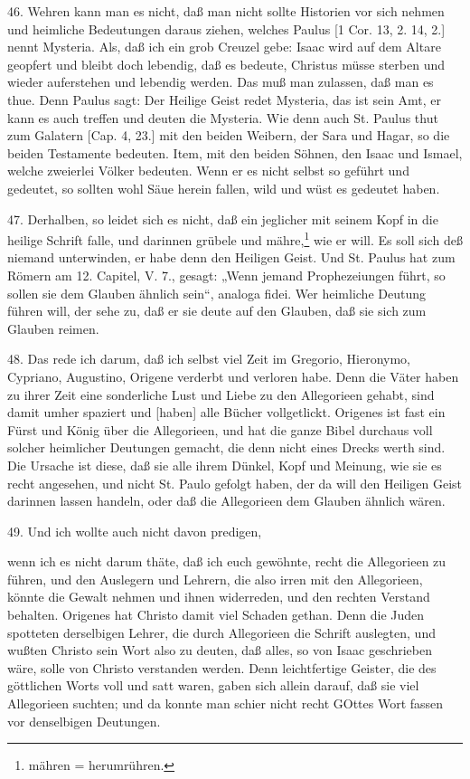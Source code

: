 46. Wehren kann man es nicht, daß man nicht sollte Historien vor sich nehmen und heimliche Bedeutungen daraus ziehen, welches Paulus [1 Cor. 13, 2. 14, 2.] nennt Mysteria. Als, daß ich ein grob Creuzel gebe: Isaac wird auf dem Altare geopfert und bleibt doch lebendig, daß es bedeute, Christus müsse sterben und wieder auferstehen und lebendig werden. Das muß man zulassen, daß man es thue. Denn Paulus sagt: Der Heilige Geist redet Mysteria, das ist sein Amt, er kann es auch treffen und deuten die Mysteria. Wie denn auch St. Paulus thut zum Galatern [Cap. 4, 23.] mit den beiden Weibern, der Sara und Hagar, so die beiden Testamente bedeuten. Item, mit den beiden Söhnen, den Isaac und Ismael, welche zweierlei Völker bedeuten. Wenn er es nicht selbst so geführt und gedeutet, so sollten wohl Säue herein fallen, wild und wüst es gedeutet haben.

47. Derhalben, so leidet sich es nicht, daß ein jeglicher mit seinem Kopf in die heilige Schrift falle, und darinnen grübele und mähre,\footnote{mähren = herumrühren.} wie er will. Es soll sich deß niemand unterwinden, er habe denn den Heiligen Geist. Und St. Paulus hat zum Römern am 12. Capitel, V. 7., gesagt: „Wenn jemand Prophezeiungen führt, so sollen sie dem Glauben ähnlich sein“, analoga fidei. Wer heimliche Deutung führen will, der sehe zu, daß er sie deute auf den Glauben, daß sie sich zum Glauben reimen.

48. Das rede ich darum, daß ich selbst viel Zeit im Gregorio, Hieronymo, Cypriano, Augustino, Origene verderbt und verloren habe. Denn die Väter haben zu ihrer Zeit eine sonderliche Lust und Liebe zu den Allegorieen gehabt, sind damit umher spaziert und [haben] alle Bücher vollgetlickt. Origenes ist fast ein Fürst und König über die Allegorieen, und hat die ganze Bibel durchaus voll solcher heimlicher Deutungen gemacht, die denn nicht eines Drecks werth sind. Die Ursache ist diese, daß sie alle ihrem Dünkel, Kopf und Meinung, wie sie es recht angesehen, und nicht St. Paulo gefolgt haben, der da will den Heiligen Geist darinnen lassen handeln, oder daß die Allegorieen dem Glauben ähnlich wären.

49. Und ich wollte auch nicht davon predigen,

wenn ich es nicht darum thäte, daß ich euch gewöhnte, recht die Allegorieen zu führen, und den Auslegern und Lehrern, die also irren mit den Allegorieen, könnte die Gewalt nehmen und ihnen widerreden, und den rechten Verstand behalten. Origenes hat Christo damit viel Schaden gethan. Denn die Juden spotteten derselbigen Lehrer, die durch Allegorieen die Schrift auslegten, und wußten Christo sein Wort also zu deuten, daß alles, so von Isaac geschrieben wäre, solle von Christo verstanden werden. Denn leichtfertige Geister, die des göttlichen Worts voll und satt waren, gaben sich allein darauf, daß sie viel Allegorieen suchten; und da konnte man schier nicht recht GOttes Wort fassen vor denselbigen Deutungen.

